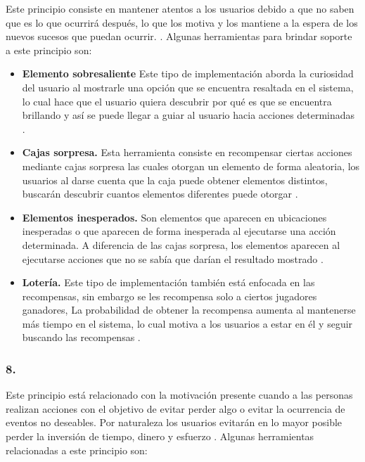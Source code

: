  Este principio consiste en mantener atentos a los usuarios debido a que no saben que es lo que
 ocurrirá después, lo que los motiva y los mantiene a la espera de los nuevos sucesos que puedan
 ocurrir. \cite[pp. 27, 273]{Octalysis}. Algunas herramientas para brindar soporte a este
 principio son:

    \begin{itemize}
    \item
    {\bf Elemento sobresaliente} %
        Este tipo de implementación aborda la curiosidad del usuario al mostrarle una opción
        que se encuentra resaltada en el sistema, lo cual hace que el usuario quiera descubrir
        por qué es que se encuentra brillando y así se puede llegar a guiar al usuario hacia
        acciones determinadas \cite[p. 297]{Octalysis}.

    \item
    {\bf Cajas sorpresa.}
        Esta herramienta consiste en recompensar ciertas acciones mediante cajas sorpresa
        las cuales otorgan un elemento de forma aleatoria, los usuarios al darse cuenta que
        la caja puede obtener elementos distintos, buscarán descubrir cuantos elementos diferentes
        puede otorgar \cite[p. 299]{Octalysis}.

    \item
    {\bf Elementos inesperados.} %
        Son elementos que aparecen en ubicaciones inesperadas o que aparecen de forma inesperada
        al ejecutarse una acción determinada. A diferencia de las cajas sorpresa, los elementos
        aparecen al ejecutarse acciones que no se sabía que darían el resultado mostrado
        \cite[p. 301]{Octalysis}.

    \item
    {\bf Lotería.}
        Este tipo de implementación también está enfocada en las recompensas, sin embargo se les
        recompensa solo a ciertos jugadores ganadores, La probabilidad de obtener la recompensa
        aumenta al mantenerse más tiempo en el sistema, lo cual motiva a los usuarios
        a estar en él y seguir buscando las recompensas \cite[p. 305]{Octalysis}.
    \end{itemize}

\clearpage
\subsubsection{8. \principioVIII} \label{subsec:principioVIII}

 Este principio está relacionado con la motivación presente cuando a las personas realizan acciones
 con el objetivo de evitar perder algo o evitar la ocurrencia de eventos no deseables. Por naturaleza
 los usuarios evitarán en lo mayor posible perder la inversión de tiempo, dinero y esfuerzo
 \cite[p. 311]{Octalysis}. Algunas herramientas relacionadas a este principio son:


